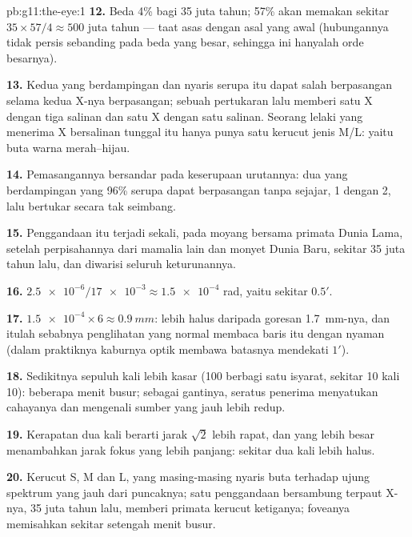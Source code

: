 \begin{solution}{pb:g11:the-eye:1}
\textbf{12.} Beda 4\% bagi 35 juta tahun; 57\% akan memakan sekitar
$35 \times 57/4 \approx 500$ juta tahun --- taat asas dengan asal
 yang awal (hubungannya tidak persis sebanding pada beda yang
besar, sehingga ini hanyalah orde besarnya).

\textbf{13.} Kedua  yang berdampingan dan nyaris serupa itu dapat
salah berpasangan selama kedua  X-nya berpasangan; sebuah
pertukaran lalu memberi satu X dengan tiga salinan dan satu X dengan
satu salinan. Seorang lelaki yang menerima X bersalinan tunggal itu
hanya punya satu kerucut jenis M/L: yaitu buta warna merah--hijau.

\textbf{14.} Pemasangannya bersandar pada keserupaan urutannya: dua 
yang berdampingan yang 96\% serupa dapat berpasangan tanpa sejajar, 
1 dengan  2, lalu bertukar secara tak seimbang.

\textbf{15.} Penggandaan itu terjadi sekali, pada moyang bersama
primata Dunia Lama, setelah perpisahannya dari mamalia lain dan monyet
Dunia Baru, sekitar 35 juta tahun lalu, dan diwarisi seluruh keturunannya.

\textbf{16.} $\num{2.5e-6}/\num{17e-3} \approx \num{1.5e-4}$ rad, yaitu
sekitar $0.5'$.

\textbf{17.} $\num{1.5e-4} \times 6 \approx \qty{0.9}{mm}$: lebih halus
daripada goresan \qty{1.7}{mm}-nya, dan itulah sebabnya penglihatan
yang normal membaca baris itu dengan nyaman (dalam praktiknya kaburnya
optik membawa batasnya mendekati $1'$).

\textbf{18.} Sedikitnya sepuluh kali lebih kasar (100 
berbagi satu isyarat, sekitar 10 kali 10): beberapa menit busur;
sebagai gantinya, seratus  penerima menyatukan cahayanya dan
mengenali sumber yang jauh lebih redup.

\textbf{19.} Kerapatan dua kali berarti jarak $\sqrt{2}$ lebih rapat,
dan  yang lebih besar menambahkan jarak fokus yang lebih panjang:
sekitar dua kali lebih halus.

\textbf{20.} Kerucut S, M dan L, yang masing-masing nyaris buta
terhadap ujung spektrum yang jauh dari puncaknya; satu penggandaan
bersambung   terpaut X-nya, 35 juta tahun lalu, memberi primata
kerucut ketiganya; foveanya memisahkan sekitar setengah menit busur.
\end{solution}
